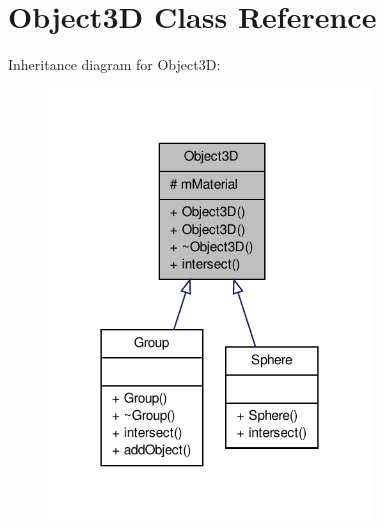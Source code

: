 \hypertarget{classObject3D}{\section{\-Object3\-D \-Class \-Reference}
\label{classObject3D}
}


\-Inheritance diagram for \-Object3\-D\-:
\nopagebreak
\begin{figure}[H]
\begin{center}
\leavevmode
\includegraphics[width=242pt]{classObject3D__inherit__graph}
\end{center}
\end{figure}


